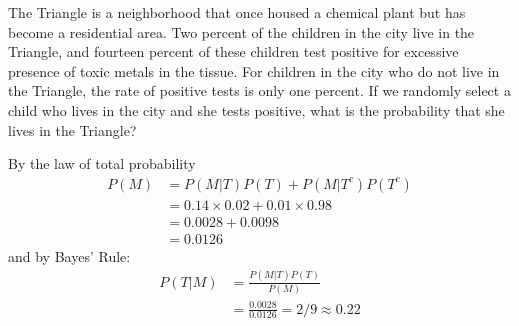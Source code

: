 \documentclass[addpoints,12pt]{exam}
\begin{document}
\begin{questions}
	
	

\question The Triangle is a neighborhood that once housed a chemical plant but has become a residential area. Two percent of the children in the city live in the Triangle, and fourteen percent of these children test positive for excessive presence of toxic metals in the tissue. For children in the city who do not live in the Triangle, the rate of positive tests is only one percent. If we randomly select a child who lives in the city and she tests positive, what is the probability that she lives in the Triangle?
		\begin{solution}
		By the law of total probability
		\begin{align*}
		P(M) &= P(M|T)P(T) + P(M|T^c)P(T^c)\\
			&= 0.14 \times 0.02 +  0.01 \times 0.98\\
			&= 0.0028 + 0.0098 \\
			&= 0.0126
		\end{align*}
		and by Bayes' Rule:
				\begin{align*}
				P(T|M) &= \frac{P(M|T)P(T)}{P(M)}\\
					&= \frac{0.0028}{0.0126} = 2/9 \approx 0.22
				\end{align*}
			\end{solution}



\end{questions}
\end{document}
